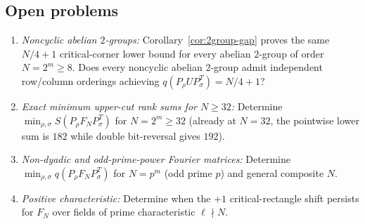 \documentclass[11pt,reqno]{amsart}
\numberwithin{equation}{section}
\theoremstyle{definition}
\theoremstyle{remark}
\begin{document}
\subsection*{Open problems}
\begin{enumerate}[label=(\arabic*),leftmargin=2em]
\item \emph{Noncyclic abelian $2$-groups:} Corollary~\ref{cor:2group-gap} proves the same $N/4+1$ critical-corner lower bound for every abelian $2$-group of order $N=2^m\ge 8$. Does every noncyclic abelian $2$-group admit independent row/column orderings achieving $q(P_\rho U P_\sigma^T)=N/4+1$?
\item \emph{Exact minimum upper-cut rank sums for $N\ge 32$:} Determine $\min_{\rho,\sigma} S(P_\rho F_N P_\sigma^T)$ for $N=2^m\ge 32$ (already at $N=32$, the pointwise lower sum is $182$ while double bit-reversal gives $192$).
\item \emph{Non-dyadic and odd-prime-power Fourier matrices:} Determine $\min_{\rho,\sigma} q(P_\rho F_N P_\sigma^T)$ for $N=p^m$ (odd prime $p$) and general composite $N$.
\item \emph{Positive characteristic:} Determine when the $+1$ critical-rectangle shift persists for $F_N$ over fields of prime characteristic $\ell\nmid N$.
\end{enumerate}
\end{document}
